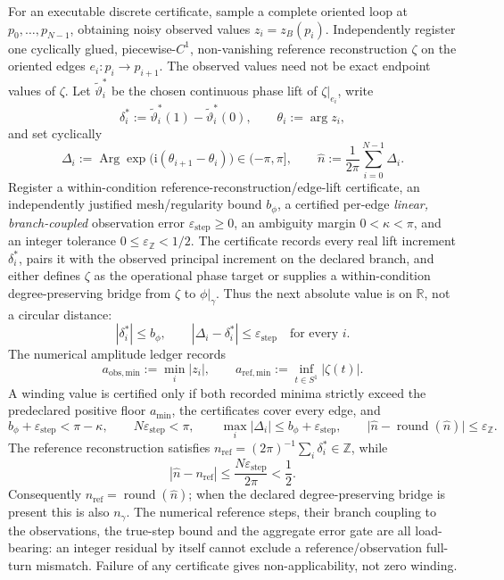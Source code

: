\documentclass[11pt]{article}
\theoremstyle{definition}
\begin{document}
For an executable discrete certificate, sample a complete oriented loop at
\(p_0,\ldots,p_{N-1}\), obtaining noisy observed values
\(z_i=z_B(p_i)\).  Independently register one cyclically glued,
piecewise-\(C^1\), non-vanishing reference reconstruction \(\zeta\) on the
oriented edges \(e_i:p_i\to p_{i+1}\).  The observed values need not be exact
endpoint values of \(\zeta\).  Let \(\widetilde\vartheta_i^*\) be the chosen
continuous phase lift of \(\zeta|_{e_i}\), write
\[
\delta_i^*:=\widetilde\vartheta_i^*(1)-\widetilde\vartheta_i^*(0),
\qquad \theta_i:=\arg z_i,
\]
and set cyclically
\[
\Delta_i:=\operatorname{Arg}
 \exp\!\bigl(\mathrm i(\theta_{i+1}-\theta_i)\bigr)\in(-\pi,\pi],
\qquad
\widehat n:=\frac1{2\pi}\sum_{i=0}^{N-1}\Delta_i.
\]
Register a within-condition reference-reconstruction/edge-lift certificate, an
independently justified mesh/regularity bound \(b_\phi\), a certified per-edge
\emph{linear, branch-coupled} observation error
\(\varepsilon_{\mathrm{step}}\ge0\), an ambiguity margin
\(0<\kappa<\pi\), and an integer tolerance
\(0\le\varepsilon_{\mathbb Z}<1/2\).  The certificate records every real lift
increment \(\delta_i^*\), pairs it with the observed principal increment on
the declared branch, and either defines \(\zeta\) as the operational phase
target or supplies a within-condition degree-preserving bridge from \(\zeta\)
to \(\phi|_\gamma\).  Thus the next absolute value is on \(\mathbb R\), not a
circular distance:
\[
|\delta_i^*|\le b_\phi,\qquad
|\Delta_i-\delta_i^*|\le\varepsilon_{\mathrm{step}}
\quad\text{for every }i.
\]
The numerical amplitude ledger records
\[
a_{\mathrm{obs,min}}:=\min_i|z_i|,
\qquad
a_{\mathrm{ref,min}}:=\inf_{t\in S^1}|\zeta(t)|.
\]
A winding value is certified only if both recorded minima strictly exceed the
predeclared positive floor \(a_{\min}\), the certificates cover every edge, and
\[
b_\phi+\varepsilon_{\mathrm{step}}<\pi-\kappa,\qquad
N\varepsilon_{\mathrm{step}}<\pi,\qquad
\max_i|\Delta_i|\le b_\phi+\varepsilon_{\mathrm{step}},\qquad
\bigl|\widehat n-\operatorname{round}(\widehat n)\bigr|
 \le\varepsilon_{\mathbb Z}.
\]
The reference reconstruction satisfies
\(n_{\mathrm{ref}}=(2\pi)^{-1}\sum_i\delta_i^*\in\mathbb Z\), while
\[
|\widehat n-n_{\mathrm{ref}}|
 \le \frac{N\varepsilon_{\mathrm{step}}}{2\pi}<\frac12.
\]
Consequently
\(n_{\mathrm{ref}}=\operatorname{round}(\widehat n)\); when the declared
degree-preserving bridge is present this is also \(n_\gamma\).  The numerical
reference steps, their branch coupling to the observations, the true-step
bound and the aggregate error gate are all load-bearing: an integer residual
by itself cannot exclude a reference/observation full-turn mismatch.  Failure
of any certificate gives non-applicability, not zero winding.
\end{document}
